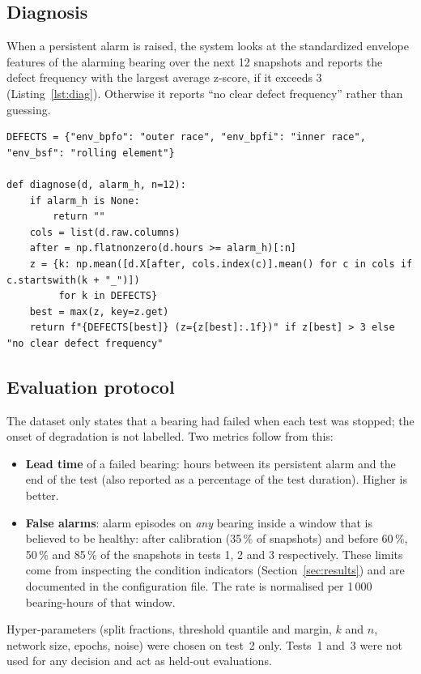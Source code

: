 \documentclass[11pt]{article}
\begin{document}
\subsection{Diagnosis}
When a persistent alarm is raised, the system looks at the standardized envelope features of the
alarming bearing over the next 12 snapshots and reports the defect frequency with the largest average
z-score, if it exceeds 3 (Listing~\ref{lst:diag}). Otherwise it reports ``no clear defect frequency''
rather than guessing.

\begin{lstlisting}[caption={Envelope-based diagnosis (excerpt of \code{scripts/run\_experiment.py}).},label=lst:diag]
DEFECTS = {"env_bpfo": "outer race", "env_bpfi": "inner race", "env_bsf": "rolling element"}

def diagnose(d, alarm_h, n=12):
    if alarm_h is None:
        return ""
    cols = list(d.raw.columns)
    after = np.flatnonzero(d.hours >= alarm_h)[:n]
    z = {k: np.mean([d.X[after, cols.index(c)].mean() for c in cols if c.startswith(k + "_")])
         for k in DEFECTS}
    best = max(z, key=z.get)
    return f"{DEFECTS[best]} (z={z[best]:.1f})" if z[best] > 3 else "no clear defect frequency"
\end{lstlisting}

\subsection{Evaluation protocol}
The dataset only states that a bearing had failed when each test was stopped; the onset of degradation
is not labelled. Two metrics follow from this:
\begin{itemize}
  \item \textbf{Lead time} of a failed bearing: hours between its persistent alarm and the end of the
        test (also reported as a percentage of the test duration). Higher is better.
  \item \textbf{False alarms}: alarm episodes on \emph{any} bearing inside a window that is believed to
        be healthy: after calibration (35\,\% of snapshots) and before 60\,\%, 50\,\% and 85\,\% of the
        snapshots in tests 1, 2 and 3 respectively. These limits come from inspecting the condition
        indicators (Section~\ref{sec:results}) and are documented in the configuration file. The rate
        is normalised per 1\,000 bearing-hours of that window.
\end{itemize}
Hyper-parameters (split fractions, threshold quantile and margin, $k$ and $n$, network size,
epochs, noise) were chosen on test~2 only. Tests~1 and~3 were not used for any decision and act as
held-out evaluations.
\end{document}
